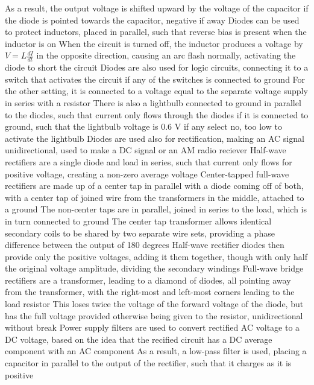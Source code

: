 \documentclass[11 pt, twoside]{article}
\newenvironment{outline*}
{
	\begin{outline}[enumerate]
	}
	{\end{outline}
}
\begin{document}
\begin{outline*}
		\3 As a result, the output voltage is shifted upward by the voltage of the capacitor if the diode is pointed towards the capacitor, negative if away
	\2 Diodes can be used to protect inductors, placed in parallel, such that reverse bias is present when the inductor is on
		\3 When the circuit is turned off, the inductor produces a voltage by $V = L\frac{dI}{dt}$ in the opposite direction, causing an arc flash normally, activating the diode to short the circuit
	\2 Diodes are also used for logic circuits, connecting it to a switch that activates the circuit if any of the switches is connected to ground	
		\3 For the other setting, it is connected to a voltage equal to the separate voltage supply in series with a resistor
		\3 There is also a lightbulb connected to ground in parallel to the diodes, such that current only flows through the diodes if it is connected to ground, such that the lightbulb voltage is 0.6 V if any select no, too low to activate the lightbulb
\1 Diodes are used also for rectification, making an AC signal unidirectional, used to make a DC signal or an AM radio reciever
	\2 Half-wave rectifiers are a single diode and load in series, such that current only flows for positive voltage, creating a non-zero average voltage
	\2 Center-tapped full-wave rectifiers are made up of a center tap in parallel with a diode coming off of both, with a center tap of joined wire from the transformers in the middle, attached to a ground
		\3 The non-center taps are in parallel, joined in series to the load, which is in turn connected to ground
		\3 The center tap transformer allows identical secondary coils to be shared by two separate wire sets, providing a phase difference between the output of 180 degrees
		\3 Half-wave rectifier diodes then provide only the positive voltages, adding it them together, though with only half the original voltage amplitude, dividing the secondary windings
	\2 Full-wave bridge rectifiers are a transformer, leading to a diamond of diodes, all pointing away from the transformer, with the right-most and left-most corners leading to the load resistor
		\3 This loses twice the voltage of the forward voltage of the diode, but has the full voltage provided otherwise being given to the resistor, unidirectional without break
\1 Power supply filters are used to convert rectified AC voltage to a DC voltage, based on the idea that the recified circuit has a DC average component with an AC component
	\2 As a result, a low-pass filter is used, placing a capacitor in parallel to the output of the rectifier, such that it charges as it is positive

\end{outline*}
\end{document}
